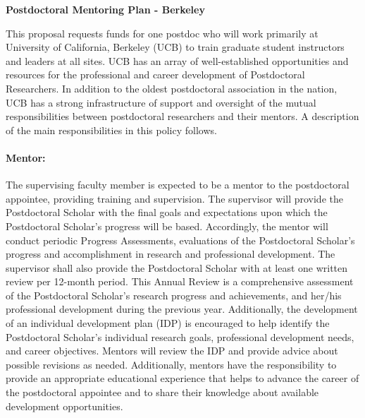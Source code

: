 \documentclass{proposalnsf}
\newlength{\up}
\begin{document}

\begin{center}
\large\textbf{Postdoctoral Mentoring Plan - Berkeley}
\end{center}

This proposal requests funds for one postdoc who will work primarily at University of California, Berkeley (UCB) to train graduate student instructors and
leaders at all sites. UCB has an array of
well-established opportunities and resources for the professional and career
development of Postdoctoral Researchers. In addition to the oldest postdoctoral
association in the nation, UCB has a strong
infrastructure of support and oversight of the mutual responsibilities between
postdoctoral researchers and their mentors. A description of the main
responsibilities in this policy follows.

\paragraph{Mentor:} The supervising faculty member is expected to be a mentor to the
postdoctoral appointee, providing training and supervision. The supervisor will
provide the Postdoctoral Scholar with the final goals and expectations upon
which the Postdoctoral Scholar’s progress will be based. Accordingly, the
mentor will conduct periodic Progress Assessments, evaluations of the
Postdoctoral Scholar’s progress and accomplishment in research and professional
development.  The supervisor shall also provide the Postdoctoral Scholar with
at least one written review per 12-month period. This Annual Review is a
comprehensive assessment of the Postdoctoral Scholar’s research progress and
achievements, and her/his professional development during the previous year.
Additionally, the development of an individual development plan (IDP) is
encouraged to help identify the Postdoctoral Scholar’s individual research
goals, professional development needs, and career objectives. Mentors will
review the IDP and provide advice about possible revisions as needed.
Additionally, mentors have the responsibility to provide an appropriate
educational experience that helps to advance the career of the postdoctoral
appointee and to share their knowledge about available development
opportunities. 
\end{document}

